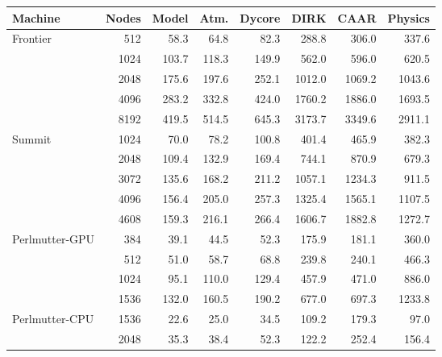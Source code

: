 \begin{tabular}{lr|rrrrrr}
Machine & Nodes & Model & Atm. & Dycore & DIRK & CAAR & Physics \\
\hline
Frontier & 512 & 58.3 & 64.8 & 82.3 & 288.8 & 306.0 & 337.6 \\
 & 1024 & 103.7 & 118.3 & 149.9 & 562.0 & 596.0 & 620.5 \\
 & 2048 & 175.6 & 197.6 & 252.1 & 1012.0 & 1069.2 & 1043.6 \\
 & 4096 & 283.2 & 332.8 & 424.0 & 1760.2 & 1886.0 & 1693.5 \\
 & 8192 & 419.5 & 514.5 & 645.3 & 3173.7 & 3349.6 & 2911.1 \\
\hline
Summit & 1024 & 70.0 & 78.2 & 100.8 & 401.4 & 465.9 & 382.3 \\
 & 2048 & 109.4 & 132.9 & 169.4 & 744.1 & 870.9 & 679.3 \\
 & 3072 & 135.6 & 168.2 & 211.2 & 1057.1 & 1234.3 & 911.5 \\
 & 4096 & 156.4 & 205.0 & 257.3 & 1325.4 & 1565.1 & 1107.5 \\
 & 4608 & 159.3 & 216.1 & 266.4 & 1606.7 & 1882.8 & 1272.7 \\
\hline
Perlmutter-GPU & 384 & 39.1 & 44.5 & 52.3 & 175.9 & 181.1 & 360.0 \\
 & 512 & 51.0 & 58.7 & 68.8 & 239.8 & 240.1 & 466.3 \\
 & 1024 & 95.1 & 110.0 & 129.4 & 457.9 & 471.0 & 886.0 \\
 & 1536 & 132.0 & 160.5 & 190.2 & 677.0 & 697.3 & 1233.8 \\
\hline
Perlmutter-CPU & 1536 & 22.6 & 25.0 & 34.5 & 109.2 & 179.3 & 97.0 \\
 & 2048 & 35.3 & 38.4 & 52.3 & 122.2 & 252.4 & 156.4 \\
\end{tabular}
